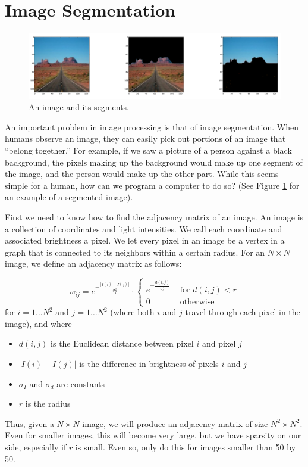 \section*{Image Segmentation}

\begin{figure}
\centering
\includegraphics[width=\textwidth]{monuments.png}
\caption{An image and its segments.}
\label{fig:monument}
\end{figure}

An important problem in image processing is that of image segmentation.
When humans observe an image, they can easily pick out portions of an image that ``belong together.''
For example, if we saw a picture of a person against a black background, the pixels making up the background would make up one segment of the image, and the person would make up the other part.
While this seems simple for a human, how can we program a computer to do so? (See Figure \ref{fig:monument} for an example of a segmented image).

First we need to know how to find the adjacency matrix of an image.
An image is a collection of coordinates and light intensities.
We call each coordinate and associated brightness a pixel.
We let every pixel in an image be a vertex in a graph that is connected to its neighbors within a certain radius.
For an $N \times N$ image, we define an adjacency matrix as follows:

\begin{equation}
\label{eq:adjacency}
w_{ij} = e^{-\frac{|I(i) - I(j)|}{\sigma_I^2}} \cdot \begin{cases} e^{-\frac{d(i,j)}{\sigma_d^2}} & \mbox{ for $d(i,j) < r$} \\ 0 & \mbox{ otherwise} \end{cases}
\end{equation}
for $i = 1 \hdots N^2$ and $j = 1 \hdots N^2$ (where both $i$ and $j$ travel through each pixel in the image), and where
\begin{itemize}
	\item$d(i,j)$ is the Euclidean distance between pixel $i$ and pixel $j$
	\item $|I(i) - I(j)|$ is the difference in brightness of pixels $i$ and $j$
	\item $\sigma_I$ and $\sigma_d$ are constants
	\item $r$ is the radius
\end{itemize}
Thus, given a $N\times N$ image, we will produce an adjacency matrix of size $N^2\times N^2$.
Even for smaller images, this will become very large, but we have sparsity on our side, especially if $r$ is small.
Even so, only do this for images smaller than 50 by 50.

